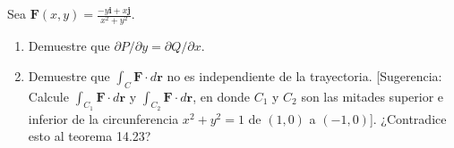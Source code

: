 \item Sea $\mathbf{F}(x, y) = \frac{-y\mathbf{i} + x\mathbf{j}}{x^2 + y^2}$.
    \begin{enumerate}
        \item[(a)] Demuestre que $\partial P / \partial y = \partial Q / \partial x$.
        \item[(b)] Demuestre que $\int_C \mathbf{F} \cdot d\mathbf{r}$ no es independiente de la trayectoria. [Sugerencia: Calcule $\int_{C_1} \mathbf{F} \cdot d\mathbf{r}$ y $\int_{C_2} \mathbf{F} \cdot d\mathbf{r}$, en donde $C_1$ y $C_2$ son las mitades superior e inferior de la circunferencia $x^2 + y^2 = 1$ de $(1, 0)$ a $(-1, 0)$]. ¿Contradice esto al teorema 14.23?
    \end{enumerate}

